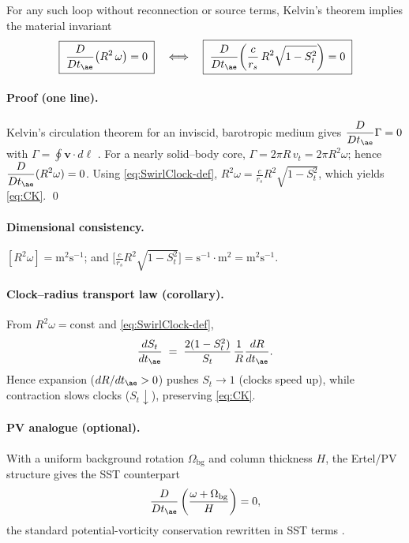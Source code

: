 \documentclass[11pt]{article}
\begin{document}
    \begin{theorem}
        For any such loop without reconnection or source terms, Kelvin’s theorem implies the
        material invariant
        \begin{equation}
            \boxed{\;
            \frac{D}{Dt_{\ae}}\!\left(R^2\,\omega\right)=0
            \;}
            \quad\Longleftrightarrow\quad
            \boxed{\;
            \frac{D}{Dt_{\ae}}\!\left(
                                    \frac{c}{r_s}\,R^2 \sqrt{1-S_t^2}
            \right)=0
            \;}
            \label{eq:CK}
        \end{equation}
    \end{theorem}

    \paragraph{Proof (one line).}
    Kelvin’s circulation theorem for an inviscid, barotropic medium gives
    $\displaystyle \frac{D}{Dt_{\ae}}\Gamma=0$ with $\Gamma=\oint \mathbf{v}\cdot d\boldsymbol{\ell}$ \cite{Helmholtz1858,Kelvin1869,Batchelor1967}.
    For a nearly solid–body core, $\Gamma=2\pi R\, v_t=2\pi R^2 \omega$; hence
    $\displaystyle \frac{D}{Dt_{\ae}}(R^2\omega)=0$.
    Using \eqref{eq:SwirlClock-def}, $R^2\omega=\tfrac{c}{r_s} R^2\sqrt{1-S_t^2}$, which yields \eqref{eq:CK}. \qed

    \paragraph{Dimensional consistency.}
    $[R^2\omega]=\text{m}^2\text{s}^{-1}$; and
    $\big[\tfrac{c}{r_s}R^2\sqrt{1-S_t^2}\big]=\text{s}^{-1}\cdot\text{m}^2=\text{m}^2\text{s}^{-1}$.

    \paragraph{Clock–radius transport law (corollary).}
    From $R^2\omega=\text{const}$ and \eqref{eq:SwirlClock-def},
    \begin{equation}
        \frac{dS_t}{dt_{\ae}} \;=\; \frac{2(1-S_t^2)}{S_t}\,\frac{1}{R}\frac{dR}{dt_{\ae}} .
        \label{eq:clock-radius-ode}
    \end{equation}
    Hence expansion ($dR/dt_{\ae}>0$) pushes $S_t\!\to\!1$ (clocks speed up), while contraction
    slows clocks ($S_t\!\downarrow$), preserving \eqref{eq:CK}.

    \paragraph{PV analogue (optional).}
    With a uniform background rotation $\Omega_{\text{bg}}$ and column thickness $H$,
    the Ertel/PV structure gives the SST counterpart
    \begin{equation}
        \frac{D}{Dt_{\ae}}
        \left(
            \frac{\omega+\Omega_{\text{bg}}}{H}
        \right)=0,
        \label{eq:PV-analogue}
    \end{equation}
    the standard potential-vorticity conservation rewritten in SST terms \cite{Ertel1942,Batchelor1967}.
\end{document}
